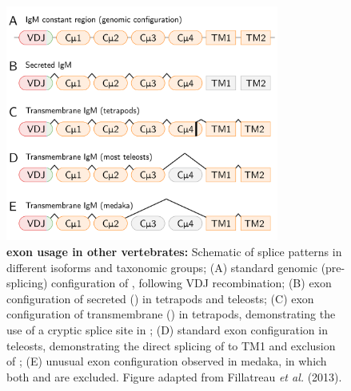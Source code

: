	\begin{figure}
	\centering
		    \begin{subfigure}{0em}
        \label{fig:teleost-igm-exons-a}
    \end{subfigure}
    \begin{subfigure}{0em}
        \label{fig:teleost-igm-exons-b}
    \end{subfigure}
    \begin{subfigure}{0em}
        \label{fig:teleost-igm-exons-c}
    \end{subfigure}
    \begin{subfigure}{0em}
        \label{fig:teleost-igm-exons-d}
    \end{subfigure}
    \begin{subfigure}{0em}
        \label{fig:teleost-igm-exons-e}
    \end{subfigure}
	\includegraphics[width=0.8\textwidth]{_Figures/png_edited/teleost-igm-exons}
	\caption[ exon usage in other vertebrates]{\textbf{ exon usage in other vertebrates:} Schematic of  splice patterns in different isoforms and taxonomic groups; (A) standard genomic (pre-splicing) configuration of , following VDJ recombination; (B) exon configuration of secreted  () in tetrapods and teleosts; (C) exon configuration of transmembrane  () in tetrapods, demonstrating the use of a cryptic splice site in ; (D) standard  exon configuration in teleosts, demonstrating the direct splicing of  to TM1 and exclusion of ; (E) unusual  exon configuration observed in medaka, in which both  and  are excluded. Figure adapted from Fillatreau \textit{et al.} (2013).}
	\label{fig:teleost-igm-exons}
	\end{figure}
	
